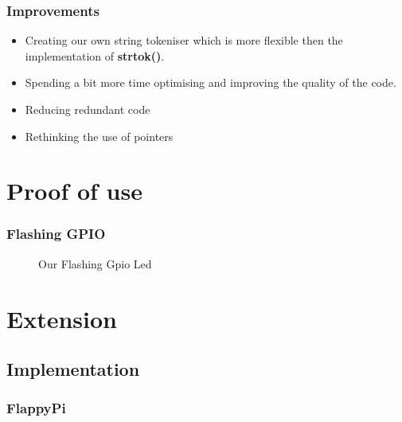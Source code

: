 \documentclass{beamer}
\begin{document}

\begin{frame}
\frametitle{Improvements}
\begin{itemize}
	\item Creating our own string tokeniser which is more flexible then the implementation of \textbf{strtok()}.
	\item Spending a bit more time optimising and improving the quality of the code.
	\item Reducing redundant code
	\item Rethinking the use of pointers
\end{itemize}
\end{frame}

\section{Proof of use}
\begin{frame}
\frametitle{Flashing GPIO}

\begin{figure}


\caption{Our Flashing Gpio Led}
\end{figure}


\end{frame}
\section{Extension}

\subsection{Implementation}

\begin{frame}
\frametitle{FlappyPi}





\end{frame}
\end{document}
